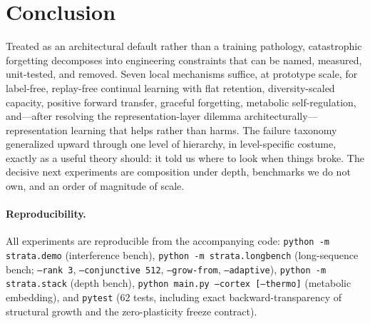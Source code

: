 \documentclass[11pt]{article}
\newcommand{\code}[1]{\texttt{#1}}
\begin{document}
\section{Conclusion}

Treated as an architectural default rather than a training pathology,
catastrophic forgetting decomposes into engineering constraints that can be
named, measured, unit-tested, and removed. Seven local mechanisms suffice,
at prototype scale, for label-free, replay-free continual learning with
flat retention, diversity-scaled capacity, positive forward transfer,
graceful forgetting, metabolic self-regulation, and---after resolving the
representation-layer dilemma architecturally---representation learning that
helps rather than harms. The failure taxonomy generalized upward through
one level of hierarchy, in level-specific costume, exactly as a useful
theory should: it told us where to look when things broke. The decisive
next experiments are composition under depth, benchmarks we do not own,
and an order of magnitude of scale.

\paragraph{Reproducibility.} All experiments are reproducible from the
accompanying code: \code{python -m strata.demo} (interference bench),
\code{python -m strata.longbench} (long-sequence bench; \code{--rank 3},
\code{--conjunctive 512}, \code{--grow-from}, \code{--adaptive}),
\code{python -m strata.stack} (depth bench), \code{python main.py --cortex
[--thermo]} (metabolic embedding), and \code{pytest} (62 tests, including
exact backward-transparency of structural growth and the zero-plasticity
freeze contract).
\end{document}
